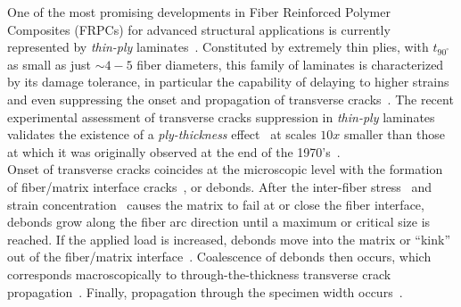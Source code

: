 \documentclass[a4paper,fleqn]{cas-dc}
\begin{document}
One of the most promising developments in Fiber Reinforced Polymer Composites (FRPCs) for advanced structural applications is currently represented by \emph{thin-ply} laminates~\cite{Kopp2017}. Constituted by extremely thin plies, with $t_{90^{\circ}}$ as small as just $\sim4-5$ fiber diameters, this family of laminates is characterized by its damage tolerance, in particular the capability of delaying to higher strains and even suppressing the onset and propagation of transverse cracks~\cite{Cugnoni2018}. The recent experimental assessment of transverse cracks suppression in \emph{thin-ply} laminates~\cite{Sasayama2003,Saito2012,Amacher2014} validates the existence of a \emph{ply-thickness} effect~\cite{Amacher2014} at scales $10x$ smaller than those at which it was originally observed at the end of the 1970's~\cite{Bailey1979}.\\
Onset of transverse cracks coincides at the microscopic level with the formation of fiber/matrix interface cracks~\cite{Bailey1981}, or debonds. After the inter-fiber stress~\cite{Asp1996} and strain concentration~\cite{Kies1962} causes the matrix to fail at or close the fiber interface, debonds grow along the fiber arc direction until a maximum or critical size is reached. If the applied load is increased, debonds move into the matrix or ``kink'' out of the fiber/matrix interface~\cite{Zhang1997,Paris2007}. Coalescence of debonds then occurs, which corresponds macroscopically to through-the-thickness transverse crack propagation~\cite{Zhang1997,Zhuang2018}. Finally, propagation through the specimen width occurs~\cite{Zhang1997}.\\
\end{document}
